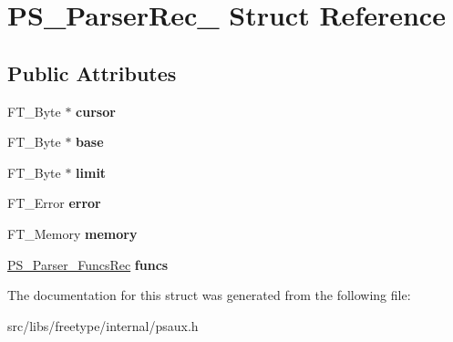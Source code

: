 \hypertarget{struct_p_s___parser_rec__}{
\section{PS\_\-ParserRec\_\- Struct Reference}
\label{struct_p_s___parser_rec__}
}
\subsection*{Public Attributes}
\begin{DoxyCompactItemize}
\item 
\hypertarget{struct_p_s___parser_rec___a6ed189bc25c03814bdafad63819ddfe7}{
FT\_\-Byte $\ast$ {\bfseries cursor}}
\label{struct_p_s___parser_rec___a6ed189bc25c03814bdafad63819ddfe7}

\item 
\hypertarget{struct_p_s___parser_rec___a30528f6a9caffce2fd44ef2d5a38e5bd}{
FT\_\-Byte $\ast$ {\bfseries base}}
\label{struct_p_s___parser_rec___a30528f6a9caffce2fd44ef2d5a38e5bd}

\item 
\hypertarget{struct_p_s___parser_rec___af3310795fd73530036fb32ec4385ea3d}{
FT\_\-Byte $\ast$ {\bfseries limit}}
\label{struct_p_s___parser_rec___af3310795fd73530036fb32ec4385ea3d}

\item 
\hypertarget{struct_p_s___parser_rec___a7a1432cb4d8bb603663f1258224c8ec4}{
FT\_\-Error {\bfseries error}}
\label{struct_p_s___parser_rec___a7a1432cb4d8bb603663f1258224c8ec4}

\item 
\hypertarget{struct_p_s___parser_rec___a3e2206deb6c0d73f51c8c71d5db1db1f}{
FT\_\-Memory {\bfseries memory}}
\label{struct_p_s___parser_rec___a3e2206deb6c0d73f51c8c71d5db1db1f}

\item 
\hypertarget{struct_p_s___parser_rec___a450031fd9e77e55bf424dc64a8d2659d}{
\hyperlink{struct_p_s___parser___funcs_rec__}{PS\_\-Parser\_\-FuncsRec} {\bfseries funcs}}
\label{struct_p_s___parser_rec___a450031fd9e77e55bf424dc64a8d2659d}

\end{DoxyCompactItemize}


The documentation for this struct was generated from the following file:\begin{DoxyCompactItemize}
\item 
src/libs/freetype/internal/psaux.h\end{DoxyCompactItemize}
